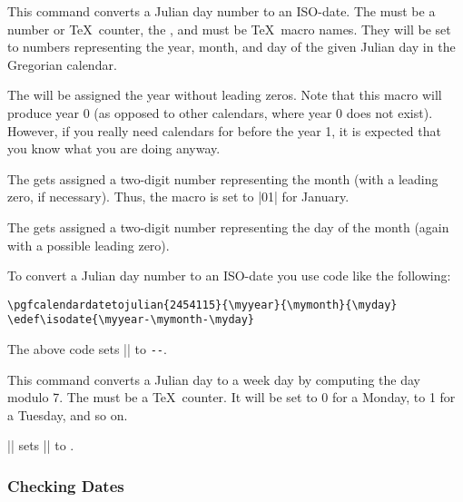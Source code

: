 \begin{command}{\pgfcalendarjuliantodate{}}
  This command converts a Julian day number to an ISO-date. The
   must be a number or \TeX\ counter, the ,
   and  must be \TeX\ macro
  names. They will be set to numbers representing the year, month, and
  day of the given Julian day in the Gregorian calendar.

  The  will be assigned the year without leading
  zeros. Note that this macro will produce year 0 (as opposed to other
  calendars, where year 0 does not exist). However, if you really need
  calendars for before the year 1, it is expected that you know what
  you are doing anyway.

  The  gets assigned a two-digit number representing
  the month (with a leading zero, if necessary). Thus, the macro is
  set to |01| for January.

  The  gets assigned a two-digit number representing
  the day of the month (again with a possible leading zero).

  To convert a Julian day number to an ISO-date you use code like the
  following:
\begin{verbatim}
\pgfcalendardatetojulian{2454115}{\myyear}{\mymonth}{\myday}
\edef\isodate{\myyear-\mymonth-\myday}
\end{verbatim}
  The above code sets |\isodate| to
  \edef\isodate{\myyear-\mymonth-\myday}\texttt{\isodate}.
\end{command}


\begin{command}{\pgfcalendarjuliantoweekday{}}
  This command converts a Julian day to a week day by computing the
  day modulo 7. The  must be a \TeX\
  counter. It will be set to 0 for a Monday, to 1 for a Tuesday, and
  so on.

  \example || sets
  |\mycount| to
  \the\mycount. 
\end{command}


\subsubsection{Checking Dates}


